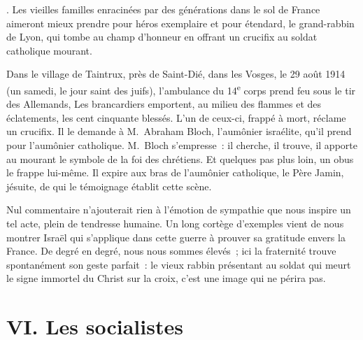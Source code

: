 \documentclass[french,twoside]{book} %
\newcommand\chapteropen{} %
\newcommand\chapterclose{} %
\begin{document}
{ }. Les vieilles familles enracinées par des générations dans le sol de France aimeront mieux prendre pour héros exemplaire et pour étendard, le grand-rabbin de Lyon, qui tombe au champ d’honneur en offrant un crucifix au soldat catholique mourant.‌\par
Dans le village de Taintrux, près de Saint-Dié, dans les Vosges, le 29 août 1914 (un samedi, le jour saint des juifs), l’ambulance du 14\textsuperscript{e} corps prend feu sous le tir des Allemands, Les brancardiers emportent, au milieu des flammes et des éclatements, les cent cinquante blessés. L’un de ceux-ci, frappé à mort, réclame un crucifix. Il le demande à M. Abraham Bloch, l’aumônier israélite, qu’il prend pour l’aumônier catholique. M. Bloch s’empresse : il cherche, il trouve, il apporte au mourant le symbole de la foi des chrétiens. Et quelques pas plus loin, un obus le frappe lui-même. Il expire aux bras de l’aumônier catholique, le Père Jamin, jésuite, de qui le témoignage établit cette scène.‌\par
Nul commentaire n’ajouterait rien à l’émotion de sympathie que nous inspire un tel acte, plein de tendresse humaine. Un long cortège d’exemples vient de nous montrer Israël qui s’applique dans cette guerre à prouver sa gratitude envers la France. De degré en degré, nous nous sommes élevés ; ici la fraternité trouve spontanément son geste parfait : le vieux rabbin présentant au soldat qui meurt le signe immortel du Christ sur la croix, c’est une image qui ne périra pas.‌
\chapterclose


\chapteropen
\chapter[VI. Les socialistes]{VI. Les socialistes}\renewcommand{\leftmark}{VI. Les socialistes}
\end{document}

